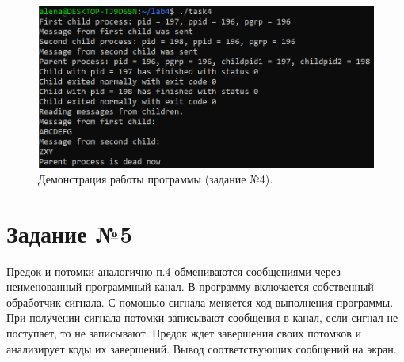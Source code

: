 \documentclass[12pt]{report}
\begin{document}
\begin{figure}[H]

	\centering

	\includegraphics[width=\linewidth]{img/task04.png}
	\caption{Демонстрация работы программы (задание №4).}

	\label{fig:task04}

\end{figure}

\section*{Задание №5}

Предок и потомки аналогично п.4 обмениваются сообщениями через неименованный программный канал. В программу включается собственный обработчик сигнала. С помощью сигнала меняется ход выполнения программы. При получении сигнала потомки записывают сообщения в канал, если сигнал не поступает, то не записывают. Предок ждет завершения своих потомков и анализирует коды их завершений. Вывод соответствующих сообщений на экран.
\end{document}
